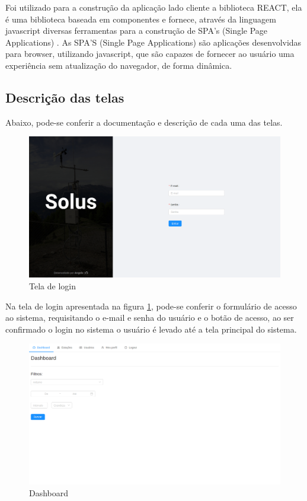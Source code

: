 Foi utilizado para a construção da aplicação lado cliente a biblioteca REACT, ela é uma biblioteca baseada em componentes e fornece, através da linguagem javascript diversas ferramentas para a construção de SPA's (Single Page Applications) \cite{what_react}. As SPA'S (Single Page Applications) são aplicações desenvolvidas para browser, utilizando javascript, que são capazes de fornecer ao usuário uma experiência sem atualização do navegador, de forma dinâmica.

\subsection{Descrição das telas}

Abaixo, pode-se conferir a documentação e descrição de cada uma das telas.

\begin{figure}[H]
    \centering
    \caption{Tela de login} \label{fig:screen_login}
    \includegraphics[scale=0.3]{telas/login.png}
    \hfill
{}
\end{figure}

Na tela de login apresentada na figura \ref{fig:screen_login}, pode-se conferir o formulário de acesso ao sistema, requisitando o e-mail e senha do usuário e o botão de acesso, ao ser confirmado o login no sistema o usuário é levado até a tela principal do sistema.

\begin{figure}[H]
    \centering
    \caption{Dashboard} \label{fig:screen_filtros}
    \includegraphics[scale=0.3]{telas/filtros.png}
    \hfill
{}
\end{figure}

